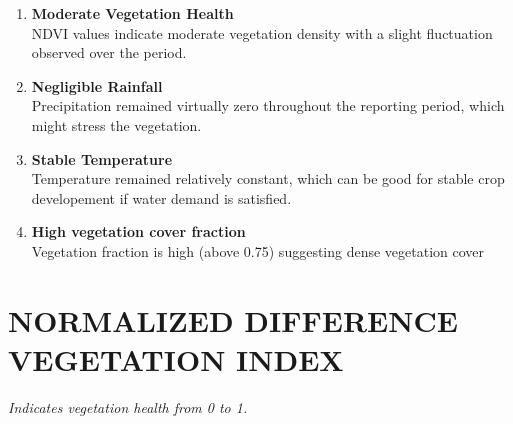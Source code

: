 \documentclass[12pt,a4paper]{article}
\begin{document}
\begin{tcolorbox}[title={\textbf{KEY INSIGHTS}}, colback=white, colframe=hydrosensblue]
\begin{enumerate}[label=\textbf{\arabic*.}, leftmargin=1.5em]
    \item \textbf{Moderate Vegetation Health}\\
    NDVI values indicate moderate vegetation density with a slight fluctuation observed over the period.
    \item \textbf{Negligible Rainfall}\\
    Precipitation remained virtually zero throughout the reporting period, which might stress the vegetation.
    \item \textbf{Stable Temperature}\\
    Temperature remained relatively constant, which can be good for stable crop developement if water demand is satisfied.
    \item \textbf{High vegetation cover fraction}\\
    Vegetation fraction is high (above 0.75) suggesting dense vegetation cover
\end{enumerate}
\end{tcolorbox}


\newpage

\section*{NORMALIZED DIFFERENCE VEGETATION INDEX}
\textit{Indicates vegetation health from 0 to 1.}

\vspace{0.5cm}
\end{document}
